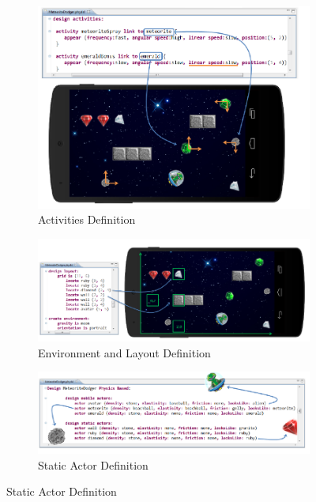\documentclass[runningheads,a4paper]{llncs}
\begin{document}
\begin{figure}[H]
\centering
\begin{subfigure}[t]{0.45\textwidth}\centering\includegraphics[width=.9\columnwidth]{images/PhyDSL3.PNG}
\caption{Activities Definition}\label{activitiesdef}\end{subfigure}\hspace*{\fill}
\begin{subfigure}[t]{0.45\textwidth}\centering\includegraphics[width=.9\columnwidth]{images/PhyDSL2.PNG}
\caption{Environment and Layout Definition}\label{envdef}\end{subfigure}
\begin{subfigure}[t]{0.45\textwidth}\centering\includegraphics[width=.9\columnwidth]{images/PhyDSL1.PNG}
\caption{Static Actor Definition}\label{actordef}\end{subfigure}\hspace*{\fill}

\end{figure}
\end{document}
